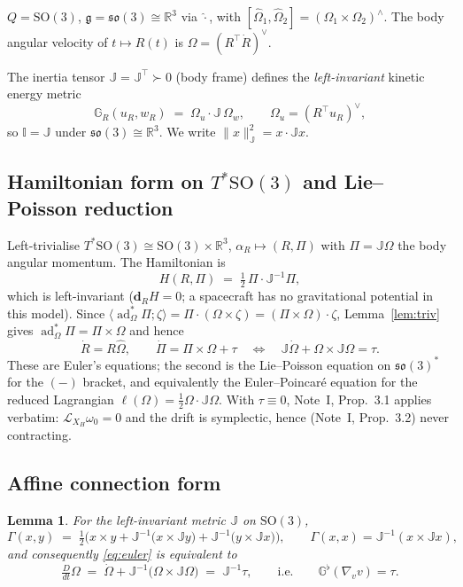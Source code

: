 \documentclass[11pt,a4paper]{article}
\newcommand{\Gm}{\mathbb{G}}
\newcommand{\Rm}{\mathbb{R}}
\newcommand{\Jm}{\mathbb{J}}
\newcommand{\Ig}{\mathbb{I}}
\newcommand{\dpair}[2]{\langle #1 ; #2 \rangle}
\newcommand{\Gflat}{\Gm^{\flat}}
\newcommand{\Lie}{\mathcal{L}}
\newcommand{\normJ}[1]{\lVert #1 \rVert_{\Jm}}
\newcommand{\Dt}{\tfrac{D}{dt}}
\newcommand{\so}{\mathfrak{so}(3)}
\newcommand{\g}{\mathfrak{g}}
\newcommand{\SO}{\mathrm{SO}(3)}
\newcommand{\ad}{\operatorname{ad}}
\theoremstyle{plain}
\newtheorem{lemma}[theorem]{Lemma}
\theoremstyle{definition}
\theoremstyle{remark}
\begin{document}
$Q = \SO$, $\g = \so \cong \Rm^3$ via $\hat{\cdot}$, with
$[\hat\Omega_1,\hat\Omega_2] = (\Omega_1\times\Omega_2)^{\wedge}$. The body
angular velocity of $t\mapsto R(t)$ is $\Omega = (R^{\top}\dot R)^{\vee}$.

The inertia tensor $\Jm=\Jm^{\top}\succ0$ (body frame) defines the
\emph{left-invariant} kinetic energy metric \cite[\S5.3]{BL04}
\begin{equation}
  \Gm_R(u_R,w_R) \;=\; \Omega_u\cdot \Jm\,\Omega_w,
  \qquad \Omega_u = (R^{\top}u_R)^{\vee},
\end{equation}
so $\Ig = \Jm$ under $\so\cong\Rm^3$. We write $\normJ{x}^2 = x\cdot\Jm x$.

\subsection{Hamiltonian form on $T^{*}\SO$ and Lie--Poisson reduction}

Left-trivialise $T^{*}\SO\cong\SO\times\Rm^3$, $\alpha_R\mapsto(R,\Pi)$ with
$\Pi = \Jm\Omega$ the body angular momentum. The Hamiltonian is
\begin{equation}
  H(R,\Pi) \;=\; \tfrac12\,\Pi\cdot\Jm^{-1}\Pi ,
\end{equation}
which is left-invariant ($\mathbf{d}_RH = 0$; a spacecraft has no gravitational
potential in this model). Since
$\dpair{\ad^{*}_{\Omega}\Pi}{\zeta} = \Pi\cdot(\Omega\times\zeta) = (\Pi\times\Omega)\cdot\zeta$,
Lemma~\ref{lem:triv} gives $\ad^{*}_{\Omega}\Pi = \Pi\times\Omega$ and hence
\begin{equation}
  \boxed{\;\dot R = R\hat\Omega, \qquad \dot\Pi = \Pi\times\Omega + \tau
  \quad\Longleftrightarrow\quad
  \Jm\dot\Omega + \Omega\times\Jm\Omega = \tau . \;}
  \label{eq:euler}
\end{equation}
These are Euler's equations; the second is the Lie--Poisson equation on
$\so^{*}$ for the $(-)$ bracket, and equivalently the Euler--Poincar\'e equation
for the reduced Lagrangian $\ell(\Omega)=\tfrac12\Omega\cdot\Jm\Omega$. With
$\tau\equiv0$, Note~I, Prop.~3.1 applies verbatim: $\Lie_{X_H}\omega_0=0$ and the
drift is symplectic, hence (Note~I, Prop.~3.2) never contracting.

\subsection{Affine connection form}

\begin{lemma}
\label{lem:so3-conn}
For the left-invariant metric $\Jm$ on $\SO$,
\begin{equation}
  \Gamma(x,y) \;=\; \tfrac12\Big( x\times y + \Jm^{-1}\big(x\times\Jm y\big)
                    + \Jm^{-1}\big(y\times\Jm x\big)\Big),
  \qquad
  \Gamma(x,x) = \Jm^{-1}(x\times\Jm x),
  \label{eq:so3-Gamma}
\end{equation}
and consequently \eqref{eq:euler} is equivalent to
\begin{equation}
  \Dt\Omega \;=\; \dot\Omega + \Jm^{-1}\big(\Omega\times\Jm\Omega\big) \;=\; \Jm^{-1}\tau,
  \qquad\text{i.e.}\qquad
  \Gflat(\nabla_v v) = \tau .
  \label{eq:so3-accs}
\end{equation}
\end{lemma}
\end{document}
